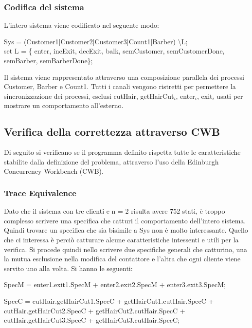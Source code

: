 \subsubsection{Codifica del sistema}

L'intero sistema viene codificato nel seguente modo:

\textsf{Sys = (Customer1|Customer2|Customer3|Count1|Barber) \textbackslash L;}\\
\textsf{set L = \{ enter, incExit, decExit, balk, semCustomer, semCustomerDone, semBarber, semBarberDone\};}

Il sistema viene rappresentato attraverso una composizione parallela dei processi \textsf{Customer, Barber e Count1}. Tutti i canali vengono ristretti per permettere la sincronizzazione dei processi, esclusi \textsf{cutHair, getHairCut$_{i}$, enter$_{i}$, exit$_{i}$} usati per mostrare un comportamento all'esterno.

\subsection{Verifica della correttezza attraverso CWB }

Di seguito si verificano se il programma definito rispetta tutte le caratteristiche stabilite dalla definizione del problema, attraverso l'uso della Edinburgh Concurrency Workbench (CWB).

\subsubsection{Trace Equivalence} 

Dato che il sistema con tre clienti e n = 2 risulta avere 752 stati, è troppo complesso scrivere una specifica che catturi il comportamento dell'intero sistema. Quindi trovare un specifica che sia bisimile a \textsf{Sys} non è molto interessante. Quello che ci interessa è perciò catturare alcune caratteristiche intessenti e utili per la verifica. Si procede quindi nello scrivere due specifiche generali che catturino, una la mutua esclusione nella modifica del contattore e l'altra che ogni cliente viene servito uno alla volta. Si hanno le seguenti:

\textsf{SpecM = enter1.exit1.SpecM + enter2.exit2.SpecM + enter3.exit3.SpecM;}

\textsf{SpecC = cutHair.getHairCut1.SpecC + getHairCut1.cutHair.SpecC + \\cutHair.getHairCut2.SpecC + getHairCut2.cutHair.SpecC + \\cutHair.getHairCut3.SpecC + getHairCut3.cutHair.SpecC;}


